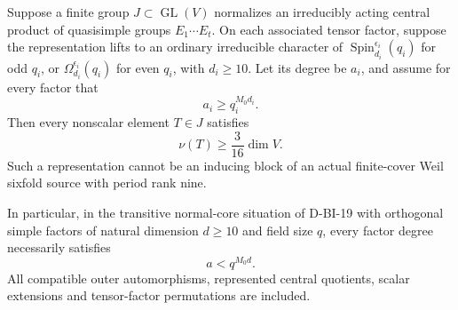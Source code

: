 \begin{lemma}
\label{D-OL-02}
Suppose a finite group $J\subset\operatorname{GL}(V)$ normalizes
an irreducibly acting central product of quasisimple groups
$E_1\cdots E_t$. On each associated tensor factor, suppose the
representation lifts to an ordinary irreducible character of
$\operatorname{Spin}_{d_i}^{\epsilon_i}(q_i)$ for odd $q_i$, or
$\Omega_{d_i}^{\epsilon_i}(q_i)$ for even $q_i$, with $d_i\ge10$.
Let its degree be $a_i$, and assume for every factor that
\[
                              a_i\ge q_i^{M_0d_i}.
                                                               \tag{OL.9}
\]
Then every nonscalar element $T\in J$ satisfies
\[
                           \nu(T)\ge\frac3{16}\dim V.
                                                               \tag{OL.10}
\]
Such a representation cannot be an inducing block of an actual
finite-cover Weil sixfold source with period rank nine.

In particular, in the transitive normal-core situation of
D-BI-19 with orthogonal simple factors of natural dimension
$d\ge10$ and field size $q$, every factor degree necessarily
satisfies
\[
                                  a<q^{M_0d}.
                                                               \tag{OL.11}
\]
All compatible outer automorphisms, represented central
quotients, scalar extensions and tensor-factor permutations
are included.
\end{lemma}

